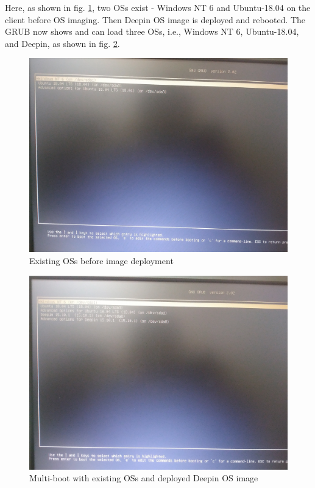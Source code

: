 \documentclass[a4paper,12pt]{article}
\begin{document}
Here, as shown in fig. \ref{before_image}, two OSs exist - Windows NT 6 and Ubuntu-18.04 on the client before OS imaging. Then Deepin OS image is deployed and rebooted. The GRUB now shows and can load three OSs, i.e., Windows NT 6, Ubuntu-18.04, and Deepin, as shown in fig. \ref{after_image}.
\begin{figure}[h!]
    \centering
    \includegraphics[width=\linewidth]{before_deploy.jpg}
    \caption{Existing OSs before image deployment}
    \label{before_image}
\end{figure}
\begin{figure}[h!]
    \centering
    \includegraphics[width=\linewidth]{after_deploy.jpg}
    \caption{Multi-boot with existing OSs and deployed Deepin OS image}
    \label{after_image}
\end{figure}
\newpage
\end{document}

